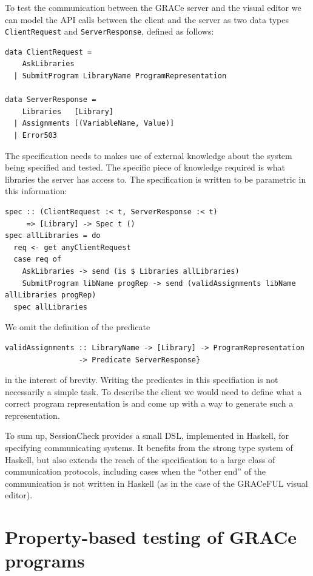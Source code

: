 \documentclass{article}
\begin{document}
To test the communication between the GRACe server and the visual editor we can model
the API calls between the client and the server as
two data types \texttt{ClientRequest} and
\texttt{ServerResponse}, defined as follows:
%
\begin{verbatim}
data ClientRequest =
    AskLibraries
  | SubmitProgram LibraryName ProgramRepresentation

data ServerResponse =
    Libraries   [Library]
  | Assignments [(VariableName, Value)]
  | Error503
\end{verbatim}

The specification needs to makes use of external knowledge about the system
being specified and tested.
%
The specific piece of knowledge required is what libraries the server has access
to.
%
The specification is written to be parametric in this information:

\begin{verbatim}
spec :: (ClientRequest :< t, ServerResponse :< t)
     => [Library] -> Spec t ()
spec allLibraries = do
  req <- get anyClientRequest
  case req of
    AskLibraries -> send (is $ Libraries allLibraries)
    SubmitProgram libName progRep -> send (validAssignments libName allLibraries progRep)
  spec allLibraries
\end{verbatim}

We omit the definition of the predicate
\begin{verbatim}
validAssignments :: LibraryName -> [Library] -> ProgramRepresentation
                 -> Predicate ServerResponse}
\end{verbatim}
in the interest of brevity.
%
Writing the predicates in this specifiation is not necessarily a simple task.
%
To describe the client we would need to define what a correct program representation is
and come up with a way to generate such a representation.

To sum up, SessionCheck provides a small DSL, implemented in Haskell,
for specifying communicating systems.
%
It benefits from the strong type system of Haskell, but also extends
the reach of the specification to a large class of communication
protocols, including cases when the ``other end'' of the communication
is not written in Haskell (as in the case of the GRACeFUL visual
editor).

\section{Property-based testing of GRACe programs}
\label{sec:GCMP}
\end{document}
